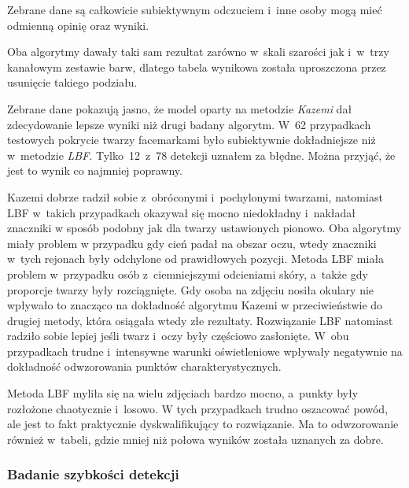 Zebrane dane są całkowicie subiektywnym odczuciem i~inne osoby mogą  mieć odmienną opinię oraz wyniki.

\vspace{5mm}

Oba algorytmy dawały taki sam rezultat zarówno w~skali szarości jak i~w~trzy kanałowym zestawie barw, dlatego tabela wynikowa została uproszczona przez usunięcie takiego podziału.



Zebrane dane pokazują jasno, że model oparty na metodzie \textit{Kazemi} dał zdecydowanie lepsze wyniki niż drugi badany algorytm. W~62 przypadkach testowych pokrycie twarzy facemarkami było subiektywnie dokładniejsze niż w~metodzie \textit{LBF}. Tylko~12~z~78 detekcji uznałem za błędne. Można przyjąć, że jest to wynik co najmniej poprawny.

\par

Kazemi dobrze radził sobie z~obróconymi i~pochylonymi twarzami, natomiast LBF w~takich przypadkach okazywał się mocno niedokładny i~nakładał znaczniki w sposób podobny jak dla twarzy ustawionych pionowo. Oba algorytmy miały problem w przypadku gdy cień padał na obszar oczu, wtedy znaczniki w~tych rejonach były odchylone od prawidłowych pozycji. Metoda LBF miała problem w~przypadku osób z~ciemniejszymi odcieniami skóry, a~także gdy proporcje twarzy były rozciągnięte. Gdy osoba na zdjęciu nosiła okulary nie wpływało to znacząco na dokładność algorytmu Kazemi w przeciwieństwie do drugiej metody, która osiągała wtedy złe rezultaty. Rozwiązanie LBF natomiast radziło sobie lepiej jeśli twarz i~oczy były częściowo zasłonięte. W~obu przypadkach trudne i~intensywne warunki oświetleniowe wpływały negatywnie na dokładność odwzorowania punktów charakterystycznych. 

\par

Metoda LBF myliła się na wielu zdjęciach bardzo mocno, a~punkty były rozłożone chaotycznie i~losowo. W tych przypadkach trudno oszacować powód, ale jest to fakt praktycznie dyskwalifikujący to rozwiązanie. Ma to odwzorowanie również w~tabeli, gdzie mniej niż połowa wyników została uznanych za dobre. 





\subsubsection{Badanie szybkości detekcji}


